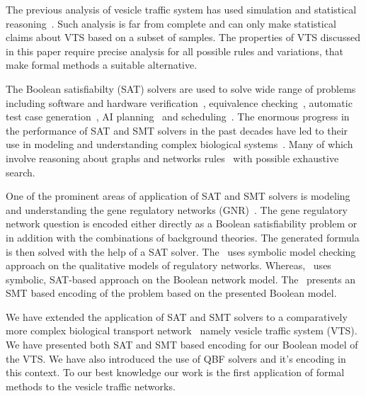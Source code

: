 \noindent The previous analysis of vesicle traffic system has used simulation and statistical reasoning~\cite{mani2016stacking}. 
%
Such analysis is far from complete and can only make statistical claims about VTS based on a subset of samples. 
%
The properties of VTS discussed in this paper require precise analysis for all possible rules and variations, that make formal methods a suitable alternative.

The Boolean satisfiabilty (SAT) solvers are used to solve wide range of problems including
%
software and hardware verification~\cite{biere1999symbolic1, biere1999symbolic2, bjesse2001finding, velev2003effective}, equivalence checking~\cite{goldberg2001using}, automatic test case generation~\cite{stephan1996combinational},
AI planning~\cite{kautz1996pushing} and scheduling~\cite{gomes1998randomization}. 
%
The enormous progress in the performance of SAT and SMT solvers
in the past decades have led to their use in modeling and understanding complex biological systems~\cite{heule2010exact,yordanov2013smt,mangla2010timing}. 
%
Many of which involve reasoning about graphs and networks rules~\cite{guerra2012reasoning,chin2008biographe} with possible exhaustive search.
%

One of the prominent areas of application of SAT and SMT solvers is modeling and understanding the gene regulatory networks (GNR)~\cite{giacobbe2015model,rosenblueth2014inference, yordanov2016method, dunn2014defining, paoletti2014analyzing, koksal2013synthesis}.
%
The gene regulatory network question is encoded either directly as a Boolean satisfiability problem or in addition with the combinations of background theories.
%
The generated formula is then solved with the help of a SAT solver. 
%
The~\cite{rosenblueth2014inference} uses symbolic model checking approach on the qualitative
models of regulatory networks.
%
Whereas,~\cite{dunn2014defining}  uses symbolic, SAT-based approach on the Boolean network model. 
%
The~\cite{giacobbe2015model, yordanov2016method} presents an SMT based encoding of the problem based on the presented Boolean model.
%

We have extended the application of SAT and SMT solvers to a comparatively more complex biological transport network~\cite{mani2016stacking} namely vesicle traffic system (VTS). 
%
We have presented both SAT and SMT based encoding for our Boolean model of the VTS.
%
We have also introduced the use of QBF solvers and it's encoding in this context.
% 
To our best knowledge our work is the first application
of formal methods to the vesicle traffic networks.

